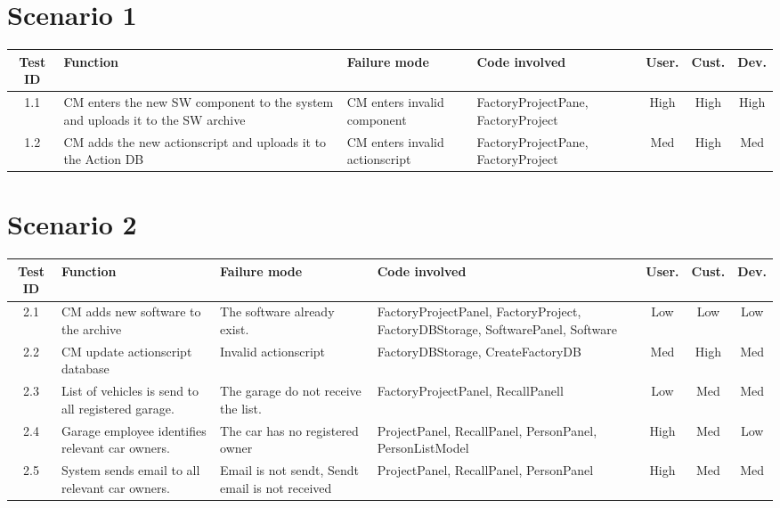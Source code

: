 	\begin{landscape}

	\section{Scenario 1}
			\begin{longtable}{ c | p{5cm} | p{5cm} | p{5cm} | c | c | c}
				\hline
				{\bf Test ID} & {\bf Function} & {\bf Failure mode} & {\bf Code involved} & 
				{\bf User.} & {\bf Cust.} & {\bf Dev.} \\ \hline
				1.1 
				& CM enters the new SW component to the system and uploads it to the SW archive
				& CM enters invalid component & FactoryProjectPane, FactoryProject
				& High & High & High \\ \hline
				1.2 
				& CM adds the new actionscript and uploads it to the Action DB
				& CM enters invalid actionscript
				& FactoryProjectPane, FactoryProject & Med & High & Med \\ \hline
		\end{longtable}	

	\section{Scenario 2}

			\begin{longtable}{ c | p{5cm} | p{5cm} | p{5cm} | c | c | c}
				\hline
				{\bf Test ID} & {\bf Function} & {\bf Failure mode} & {\bf Code involved} & 
				{\bf User.} & {\bf Cust.} & {\bf Dev.} \\ \hline
				2.1 
				& CM adds new software to the archive
				& The software already exist. 
				& FactoryProjectPanel, FactoryProject, FactoryDBStorage, SoftwarePanel, Software
				& Low & Low & Low \\ \hline
				2.2 
				& CM update actionscript database
				& Invalid actionscript
				& FactoryDBStorage, CreateFactoryDB
				& Med & High & Med \\ \hline
				2.3
				& List of vehicles is send to all registered garage.
				& The garage do not receive the list.
				& FactoryProjectPanel, RecallPanell
				& Low & Med & Med \\ \hline
				2.4
				& Garage employee identifies relevant car owners.
				& The car has no registered owner
				& ProjectPanel, RecallPanel, PersonPanel, PersonListModel
				& High & Med & Low \\ \hline
				2.5
				& System sends email to all relevant car owners.
				& Email is not sendt, Sendt email is not received
				& ProjectPanel, RecallPanel, PersonPanel
				& High & Med & Med \\ \hline
			

\end{longtable}
\end{landscape}

